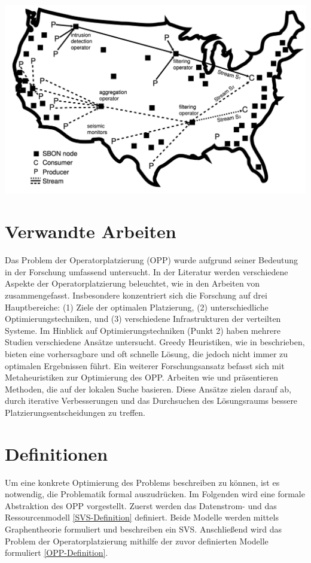 \documentclass{article}
\begin{document}
\begin{center}
    \includegraphics[width=0.5\linewidth]{res/SVS.png}
    \label{SVS-figure}
\end{center}

\section{Verwandte Arbeiten}
Das Problem der Operatorplatzierung (OPP) wurde aufgrund seiner Bedeutung in der Forschung umfassend untersucht. 
In der Literatur werden verschiedene Aspekte der Operatorplatzierung beleuchtet, wie in den Arbeiten von \cite{survey-placement-strategies,Starks2018} zusammengefasst. 
Insbesondere konzentriert sich die Forschung auf drei Hauptbereiche: (1) Ziele der optimalen Platzierung, (2) unterschiedliche Optimierungstechniken, und (3) verschiedene Infrastrukturen der verteilten Systeme.
Im Hinblick auf Optimierungstechniken (Punkt 2) haben mehrere Studien verschiedene Ansätze untersucht. 
Greedy Heuristiken, wie in \cite{greedy-distr.-svs} beschrieben, bieten eine vorhersagbare und oft schnelle Lösung, die jedoch nicht immer zu optimalen Ergebnissen führt.
Ein weiterer Forschungsansatz befasst sich mit Metaheuristiken zur Optimierung des OPP. 
Arbeiten wie \cite{whiteWater} und \cite{latency-estimation-local-search} präsentieren Methoden, die auf der lokalen Suche basieren. Diese Ansätze zielen darauf ab, durch iterative Verbesserungen und das Durchsuchen des Lösungsraums bessere Platzierungsentscheidungen zu treffen.


\section{Definitionen}
Um eine konkrete Optimierung des Problems beschreiben zu können, ist es notwendig, die Problematik formal auszudrücken. 
Im Folgenden wird eine formale Abstraktion des OPP vorgestellt. 
Zuerst werden das Datenstrom- und das Ressourcenmodell \ref{SVS-Definition} definiert. 
Beide Modelle werden mittels Graphentheorie formuliert und beschreiben ein SVS. 
Anschließend wird das Problem der Operatorplatzierung mithilfe der zuvor definierten Modelle formuliert \ref{OPP-Definition}.
\end{document}
